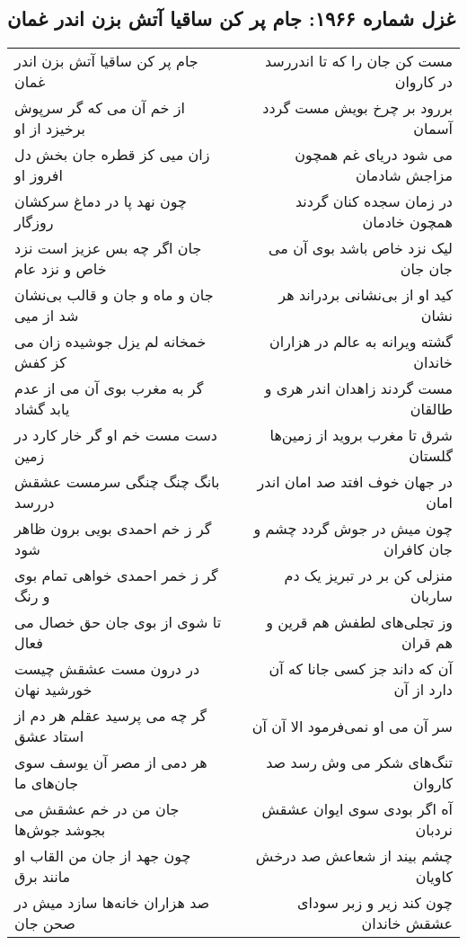 \begin{center}
\section*{غزل شماره ۱۹۶۶: جام پر کن ساقیا آتش بزن اندر غمان}
\label{sec:1966}
\begin{longtable}{l p{0.5cm} r}
جام پر کن ساقیا آتش بزن اندر غمان
&&
مست کن جان را که تا اندررسد در کاروان
\\
از خم آن می که گر سرپوش برخیزد از او
&&
بررود بر چرخ بویش مست گردد آسمان
\\
زان میی کز قطره جان بخش دل افروز او
&&
می شود دریای غم همچون مزاجش شادمان
\\
چون نهد پا در دماغ سرکشان روزگار
&&
در زمان سجده کنان گردند همچون خادمان
\\
جان اگر چه بس عزیز است نزد خاص و نزد عام
&&
لیک نزد خاص باشد بوی آن می جان جان
\\
جان و ماه و جان و قالب بی‌نشان شد از میی
&&
کید او از بی‌نشانی بردراند هر نشان
\\
خمخانه لم یزل جوشیده زان می کز کفش
&&
گشته ویرانه به عالم در هزاران خاندان
\\
گر به مغرب بوی آن می از عدم یابد گشاد
&&
مست گردند زاهدان اندر هری و طالقان
\\
دست مست خم او گر خار کارد در زمین
&&
شرق تا مغرب بروید از زمین‌ها گلستان
\\
بانگ چنگ چنگی سرمست عشقش دررسد
&&
در جهان خوف افتد صد امان اندر امان
\\
گر ز خم احمدی بویی برون ظاهر شود
&&
چون میش در جوش گردد چشم و جان کافران
\\
گر ز خمر احمدی خواهی تمام بوی و رنگ
&&
منزلی کن بر در تبریز یک دم ساربان
\\
تا شوی از بوی جان حق خصال می فعال
&&
وز تجلی‌های لطفش هم قرین و هم قران
\\
در درون مست عشقش چیست خورشید نهان
&&
آن که داند جز کسی جانا که آن دارد از آن
\\
گر چه می پرسید عقلم هر دم از استاد عشق
&&
سر آن می او نمی‌فرمود الا آن آن
\\
هر دمی از مصر آن یوسف سوی جان‌های ما
&&
تنگ‌های شکر می وش رسد صد کاروان
\\
جان من در خم عشقش می بجوشد جوش‌ها
&&
آه اگر بودی سوی ایوان عشقش نردبان
\\
چون جهد از جان من القاب او مانند برق
&&
چشم بیند از شعاعش صد درخش کاویان
\\
صد هزاران خانه‌ها سازد میش در صحن جان
&&
چون کند زیر و زبر سودای عشقش خاندان
\\

\end{longtable}
\end{center}

